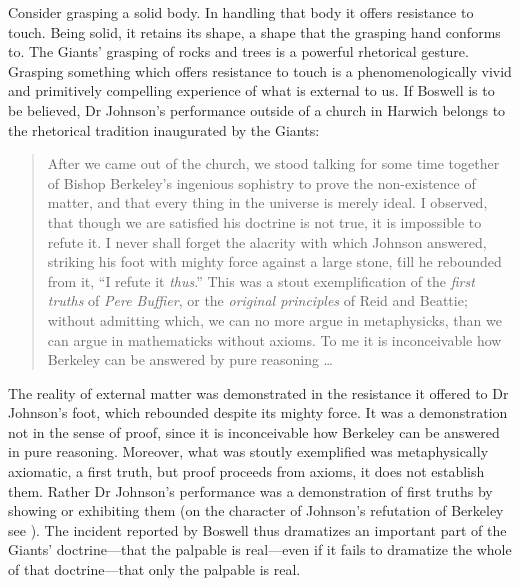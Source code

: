 Consider grasping a solid body. In handling that body it offers resistance to touch. Being solid, it retains its shape, a shape that the grasping hand conforms to. The Giants' grasping of rocks and trees is a powerful rhetorical gesture. Grasping something which offers resistance to touch is a phenomenologically vivid and primitively compelling experience of what is external to us. If Boswell is to be believed, Dr Johnson's performance outside of a church in Harwich belongs to the rhetorical tradition inaugurated by the Giants: 
\begin{quote}
	After we came out of the church, we stood talking for some time together of Bishop Berkeley's ingenious sophistry to prove the non-exist\-ence of matter, and that every thing in the universe is merely ideal. I observed, that though we are satisfied his doctrine is not true, it is impossible to refute it. I never shall forget the alacrity with which Johnson answered, striking his foot with mighty force against a large stone, \'till he rebounded from it, ``I refute it \emph{thus}.'' This was a stout exemplification of the \emph{first truths} of \emph{Pere Buffier}, or the \emph{original principles} of Reid and Beattie; without admitting which, we can no more argue in metaphysicks, than we can argue in mathematicks without axioms. To me it is inconceivable how Berkeley can be answered by pure reasoning \ldots\ \citep[\textsc{i} 471]{Boswell:1935fk}
\end{quote}
The reality of external matter was demonstrated in the resistance it offered to Dr Johnson's foot, which rebounded despite its mighty force. It was a demonstration not in the sense of proof, since it is inconceivable how Berkeley can be answered in pure reasoning. Moreover, what was stoutly exemplified was metaphysically axiomatic, a first truth, but proof proceeds from axioms, it does not establish them. Rather Dr Johnson's performance was a demonstration of first truths by showing or exhibiting them (on the character of Johnson's refutation of Berkeley see \citealt{Patey:1986uq}). The incident reported by Boswell thus dramatizes an important part of the Giants' doctrine---that the palpable is real---even if it fails to dramatize the whole of that doctrine---that only the palpable is real.
 
